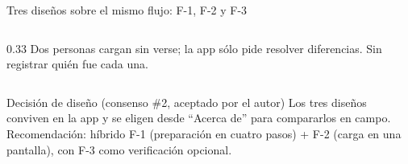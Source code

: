 \documentclass[aspectratio=169,11pt]{beamer}
\begin{document}
\begin{frame}{Tres diseños sobre el mismo flujo: F-1, F-2 y F-3}
\begin{columns}[T]
\begin{column}{0.33\textwidth}
      {\scriptsize Dos personas cargan sin verse; la app sólo pide resolver diferencias. Sin registrar quién fue cada una.}
    \end{column}
  \end{columns}
  \vspace{4pt}
  \begin{block}{Decisión de diseño (consenso \#2, aceptado por el autor)}
    \footnotesize Los tres diseños conviven en la app y se eligen desde ``Acerca de'' para compararlos en campo.
    Recomendación: híbrido F-1 (preparación en cuatro pasos) + F-2 (carga en una pantalla), con F-3 como verificación opcional.
  \end{block}
\end{frame}

\end{document}
